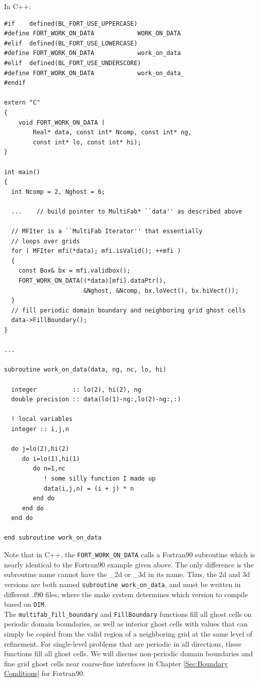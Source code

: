 In C++:
\begin{lstlisting}[backgroundcolor=\color{light-blue}]
#if    defined(BL_FORT_USE_UPPERCASE)
#define FORT_WORK_ON_DATA            WORK_ON_DATA
#elif  defined(BL_FORT_USE_LOWERCASE)
#define FORT_WORK_ON_DATA            work_on_data
#elif  defined(BL_FORT_USE_UNDERSCORE)
#define FORT_WORK_ON_DATA            work_on_data_
#endif

extern "C"
{
    void FORT_WORK_ON_DATA (
        Real* data, const int* Ncomp, const int* ng,
        const int* lo, const int* hi);
}

int main()
{
  int Ncomp = 2, Nghost = 6;

  ...    // build pointer to MultiFab* ``data'' as described above
  
  // MFIter is a ``MultiFab Iterator'' that essentially
  // loops over grids
  for ( MFIter mfi(*data); mfi.isValid(); ++mfi )
  {
    const Box& bx = mfi.validbox();
    FORT_WORK_ON_DATA((*data)[mfi].dataPtr(),
                      &Nghost, &Ncomp, bx.loVect(), bx.hiVect());
  }
  // fill periodic domain boundary and neighboring grid ghost cells
  data->FillBoundary();
}

...

subroutine work_on_data(data, ng, nc, lo, hi)

  integer          :: lo(2), hi(2), ng
  double precision :: data(lo(1)-ng:,lo(2)-ng:,:)

  ! local variables
  integer :: i,j,n

  do j=lo(2),hi(2)
     do i=lo(1),hi(1)
        do n=1,nc
           ! some silly function I made up
           data(i,j,n) = (i + j) * n
        end do
     end do
  end do

end subroutine work_on_data

\end{lstlisting}
Note that in C++, the {\tt FORT\_WORK\_ON\_DATA} calls a Fortran90 subroutine which is nearly
identical to the Fortran90 example given above.  The only difference is the subroutine
name cannot have the \_2d or \_3d in its name.  Thus, the 2d and 3d versions
are both named {\tt subroutine work\_on\_data}, and must be written in
different .f90 files, where the make system determines which version to compile
based on {\tt DIM}.\\

The {\tt multifab\_fill\_boundary} and {\tt FillBoundary} functions 
fill all ghost cells on periodic domain boundaries, as well as interior
ghost cells with values that can simply be copied from the valid region of a neighboring
grid at the same level of refinement.  For single-level problems that are periodic
in all directions, these functions fill all ghost cells.  We will discuss
non-periodic domain boundaries and fine grid ghost cells near coarse-fine interfaces
in Chapter \ref{Sec:Boundary Conditions} for Fortran90.

